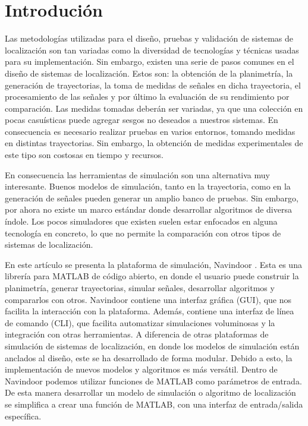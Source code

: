 \section{Introdución}


Las metodologías utilizadas para el diseño, pruebas y validación de sistemas de localización son tan variadas como la diversidad de tecnologías y técnicas usadas para su implementación. Sin embargo, existen una serie de pasos comunes en el diseño de sistemas de localización. Estos son: la obtención de la planimetría, la generación de trayectorias, la toma de medidas de señales en dicha trayectoria, el procesamiento de las señales y por último la evaluación de su rendimiento por comparación. Las medidas tomadas deberán ser variadas, ya que una colección en pocas casuísticas puede agregar sesgos no deseados a nuestros sistemas. En consecuencia es necesario realizar pruebas en varios entornos, tomando medidas en distintas trayectorias. Sin embargo, la obtención de medidas experimentales de este tipo son costosas en tiempo y recursos.


En consecuencia las herramientas de simulación son una alternativa muy interesante. Buenos modelos de simulación, tanto en la trayectoria, como en la generación de señales pueden generar un amplio banco de pruebas. Sin embargo, por ahora no existe un marco estándar donde desarrollar algoritmos de diversa índole. Los pocos simuladores que existen suelen estar enfocados en alguna tecnología en concreto, lo que no permite la comparación con otros tipos de sistemas de localización.


En este artículo se presenta la plataforma de simulación, Navindoor \cite{navindoor}. Esta es una librería para MATLAB de código abierto, en donde el usuario puede construir la planimetría, generar trayectorias, simular señales, desarrollar algoritmos y compararlos con otros. Navindoor contiene una interfaz gráfica (GUI), que nos facilita la interacción con la plataforma. Además, contiene una interfaz de línea de comando (CLI), que facilita automatizar simulaciones voluminosas y la integración con otras herramientas. A diferencia de otras plataformas de simulación de sistemas de localización, en donde los modelos de simulación están anclados al diseño, este se ha desarrollado de forma modular. Debido a esto, la implementación de nuevos modelos y algoritmos es más versátil. Dentro de Navindoor podemos utilizar funciones de MATLAB como parámetros de entrada. De esta manera desarrollar un modelo de simulación o algoritmo de localización se simplifica a crear una función de MATLAB, con una interfaz de entrada/salida específica.

